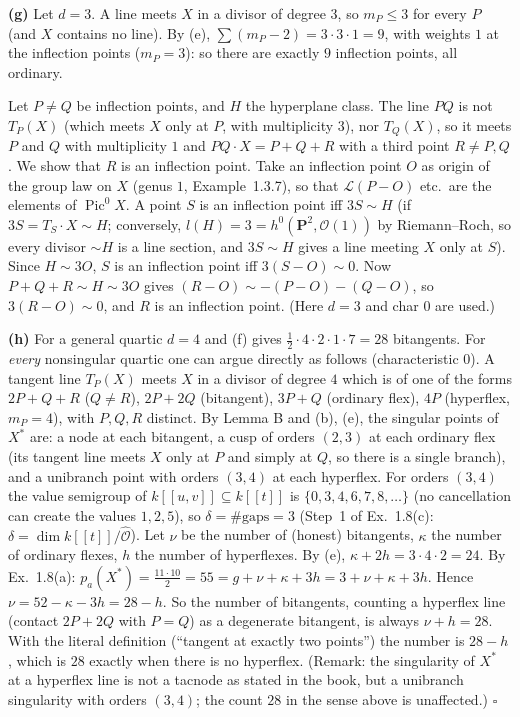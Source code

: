 \documentclass[11pt]{article}
\begin{document}
\textbf{(g)} Let $d=3$. A line meets $X$ in a divisor of degree $3$, so $m_P\le3$ for every $P$ (and $X$ contains no line). By (e), $\sum(m_P-2)=3\cdot3\cdot1=9$, with weights $1$ at the inflection points ($m_P=3$): so there are exactly $9$ inflection points, all ordinary.

Let $P\ne Q$ be inflection points, and $H$ the hyperplane class. The line $PQ$ is not $T_P(X)$ (which meets $X$ only at $P$, with multiplicity $3$), nor $T_Q(X)$, so it meets $P$ and $Q$ with multiplicity $1$ and $PQ\cdot X=P+Q+R$ with a third point $R\ne P,Q$. We show that $R$ is an inflection point. Take an inflection point $O$ as origin of the group law on $X$ (genus $1$, Example~1.3.7), so that $\mathcal L(P-O)$ etc.\ are the elements of $\operatorname{Pic}^0X$. A point $S$ is an inflection point iff $3S\sim H$ (if $3S=T_S\cdot X\sim H$; conversely, $l(H)=3=h^0(\mathbf P^2,\mathcal O(1))$ by Riemann--Roch, so every divisor $\sim H$ is a line section, and $3S\sim H$ gives a line meeting $X$ only at $S$). Since $H\sim3O$, $S$ is an inflection point iff $3(S-O)\sim0$. Now $P+Q+R\sim H\sim3O$ gives $(R-O)\sim-(P-O)-(Q-O)$, so $3(R-O)\sim0$, and $R$ is an inflection point. \hfill(Here $d=3$ and char $0$ are used.)

\textbf{(h)} For a general quartic $d=4$ and (f) gives $\frac12\cdot4\cdot2\cdot1\cdot7=28$ bitangents. For \emph{every} nonsingular quartic one can argue directly as follows (characteristic $0$). A tangent line $T_P(X)$ meets $X$ in a divisor of degree $4$ which is of one of the forms $2P+Q+R$ ($Q\ne R$), $2P+2Q$ (bitangent), $3P+Q$ (ordinary flex), $4P$ (hyperflex, $m_P=4$), with $P,Q,R$ distinct. By Lemma B and (b), (e), the singular points of $X^*$ are: a node at each bitangent, a cusp of orders $(2,3)$ at each ordinary flex (its tangent line meets $X$ only at $P$ and simply at $Q$, so there is a single branch), and a unibranch point with orders $(3,4)$ at each hyperflex. For orders $(3,4)$ the value semigroup of $k[[u,v]]\subseteq k[[t]]$ is $\{0,3,4,6,7,8,\dots\}$ (no cancellation can create the values $1,2,5$), so $\delta=\#\text{gaps}=3$ (Step~1 of Ex.~1.8(c): $\delta=\dim k[[t]]/\widehat{\mathcal O}$). Let $\nu$ be the number of (honest) bitangents, $\kappa$ the number of ordinary flexes, $h$ the number of hyperflexes. By (e), $\kappa+2h=3\cdot4\cdot2=24$. By Ex.~1.8(a): $p_a(X^*)=\frac{11\cdot10}2=55=g+\nu+\kappa+3h=3+\nu+\kappa+3h$. Hence $\nu=52-\kappa-3h=28-h$. So the number of bitangents, counting a hyperflex line (contact $2P+2Q$ with $P=Q$) as a degenerate bitangent, is always $\nu+h=28$. With the literal definition (``tangent at exactly two points'') the number is $28-h$, which is $28$ exactly when there is no hyperflex. (Remark: the singularity of $X^*$ at a hyperflex line is not a tacnode as stated in the book, but a unibranch singularity with orders $(3,4)$; the count $28$ in the sense above is unaffected.) \hfill$\square$
\end{document}
